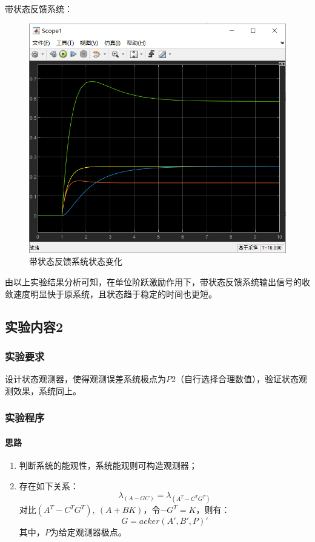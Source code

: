 \documentclass[UTF8]{article}
\begin{document}
\noindent 带状态反馈系统：
\begin{figure}[H]
    \centering %
    \includegraphics[width=.8\textwidth]{figure/exp3_1_带状态反馈系统状态.png} 
    \caption{带状态反馈系统状态变化} %
\end{figure}
由以上实验结果分析可知，在单位阶跃激励作用下，带状态反馈系统输出信号的收敛速度明显快于原系统，且状态趋于稳定的时间也更短。

\subsection{实验内容2}
\subsubsection{实验要求}
设计状态观测器，使得观测误差系统极点为$P2$（自行选择合理数值），验证状态观测效果，系统同上。


\subsubsection{实验程序}
\paragraph{思路}
\begin{enumerate}
    \item 判断系统的能观性，系统能观则可构造观测器；
    \item 存在如下关系：
$$
\lambda_{(A - GC)} = \lambda_{(A^T - C^TG^T)}
$$
对比$(A^T - C^TG^T),\ (A + BK)$，令$-G^T = K$，则有：
$$
G = acker(A', B', P)'
$$
其中，$P$为给定观测器极点。
\end{enumerate}
\end{document}
